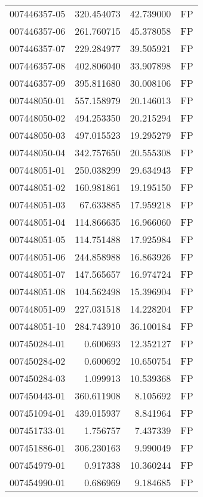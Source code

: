 \begin{tabular}{lrrl}
007446357-05 &  320.454073 &      42.739000 &   FP \\
007446357-06 &  261.760715 &      45.378058 &   FP \\
007446357-07 &  229.284977 &      39.505921 &   FP \\
007446357-08 &  402.806040 &      33.907898 &   FP \\
007446357-09 &  395.811680 &      30.008106 &   FP \\
007448050-01 &  557.158979 &      20.146013 &   FP \\
007448050-02 &  494.253350 &      20.215294 &   FP \\
007448050-03 &  497.015523 &      19.295279 &   FP \\
007448050-04 &  342.757650 &      20.555308 &   FP \\
007448051-01 &  250.038299 &      29.634943 &   FP \\
007448051-02 &  160.981861 &      19.195150 &   FP \\
007448051-03 &   67.633885 &      17.959218 &   FP \\
007448051-04 &  114.866635 &      16.966060 &   FP \\
007448051-05 &  114.751488 &      17.925984 &   FP \\
007448051-06 &  244.858988 &      16.863926 &   FP \\
007448051-07 &  147.565657 &      16.974724 &   FP \\
007448051-08 &  104.562498 &      15.396904 &   FP \\
007448051-09 &  227.031518 &      14.228204 &   FP \\
007448051-10 &  284.743910 &      36.100184 &   FP \\
007450284-01 &    0.600693 &      12.352127 &   FP \\
007450284-02 &    0.600692 &      10.650754 &   FP \\
007450284-03 &    1.099913 &      10.539368 &   FP \\
007450443-01 &  360.611908 &       8.105692 &   FP \\
007451094-01 &  439.015937 &       8.841964 &   FP \\
007451733-01 &    1.756757 &       7.437339 &   FP \\
007451886-01 &  306.230163 &       9.990049 &   FP \\
007454979-01 &    0.917338 &      10.360244 &   FP \\
007454990-01 &    0.686969 &       9.184685 &   FP \\

\end{tabular}

